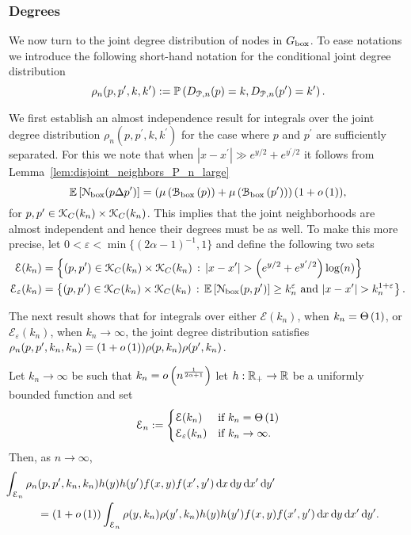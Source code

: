 \subsubsection*{Degrees}

We now turn to the joint degree distribution of nodes in $G_{\text{box}}$. To ease notations we introduce the following short-hand notation for the conditional joint degree distribution
\[
	\rho_n(p,p^\prime,k,k^\prime) 
	:= \mathbb{P}\left(D_{{\mathcal P},n}(p) = k, D_{{\mathcal P},n}(p^\prime) = k^\prime\right).
\]

We first establish an almost independence result for integrals over the joint degree distribution $\rho_{n}(p,p^\prime,k,k^\prime)$ for the case where  $p$ and $p^\prime$ are sufficiently separated. For this we note that when $|x - x^\prime| \gg e^{y/2} + e^{y^\prime/2}$ it follows from Lemma~\ref{lem:disjoint_neighbors_P_n_large}
\[
	\mathbb{E}\left[{\mathcal N}_{\text{box}}(p \Delta p^\prime)\right] = \left(\mu\left({\mathcal B}_{\text{box}}\left(p\right)\right) + \mu\left({\mathcal B}_{\text{box}}\left(p^\prime\right)\right)\right)(1 + o\left(1\right)),
\] 
for $p, p^\prime \in {\mathcal K}_{C}(k_n) \times {\mathcal K}_{C}(k_n)$. This implies that the joint neighborhoods are almost independent and hence their degrees must be as well. To make this more precise, let $0 < \varepsilon < \min\{(2\alpha - 1)^{-1},1\}$ and define the following two sets
\begin{align}
	\mathcal{E}(k_n) &= \left\{(p,p^\prime) \in {\mathcal K}_C(k_n) \times {\mathcal K}_C(k_n) 
			\, : \, |x - x^\prime| > \left(e^{y/2} + e^{y^\prime/2}\right) \log(n)
		\right\} \label{eq:def_joint_degree_set_E_constant_k} \\
	\mathcal{E}_{\varepsilon}(k_n) &= \left\{(p,p^\prime) \in {\mathcal K}_C(k_n) \times {\mathcal K}_C(k_n) 
		\, : \, \mathbb{E}\left[{\mathcal N}_{\text{box}}(p, p^\prime)\right] \ge k_n^{\varepsilon} \text{ and } |x - x^\prime| > k_n^{1 + \varepsilon} \right\}. \label{eq:def_joint_degree_set_E_growing_k}
\end{align}

The next result shows that for integrals over either $\mathcal{E}(k_n)$, when $k_n = \Theta\left(1\right)$, or $\mathcal{E}_{\varepsilon}(k_n)$, when $k_n \to \infty$, the joint degree distribution satisfies $\rho_n(p,p^\prime,k_n,k_n) = (1 + o\left(1\right))\rho(p,k_n)\rho(p^\prime,k_n)$.

\begin{lemma}\label{lem:joint_degree_factorization}
Let $k_n \to \infty$ be such that $k_n = o\left(n^{\frac{1}{2\alpha + 1}}\right)$ let $h : {\mathbb R}_+ \to {\ensuremath{\mathbb R}}$ be a uniformly bounded function and set
\[
	\mathcal{E}_n := \begin{cases}
		\mathcal{E}(k_n) &\mbox{if } k_n = \Theta\left(1\right)\\
		\mathcal{E}_\varepsilon(k_n) &\mbox{if } k_n \to \infty.
	\end{cases}
\]
Then, as $n \to \infty$,
\begin{align*}
	&\hspace{-30pt}\int_{\mathcal{E}_n} \rho_{n}(p,p^\prime,k_n,k_n) h(y)h(y^\prime) 
		f(x,y)	f(x^\prime,y^\prime) \dd x \dd y \dd x^\prime \dd y^\prime\\
	&= (1+\smallO{1})\int_{\mathcal{E}_n} \rho(y,k_n)\rho(y^\prime,k_n) h(y)h(y^\prime) 
		f(x,y)	f(x^\prime,y^\prime) \dd x \dd y \dd x^\prime \dd y^\prime.
\end{align*}
\end{lemma}

